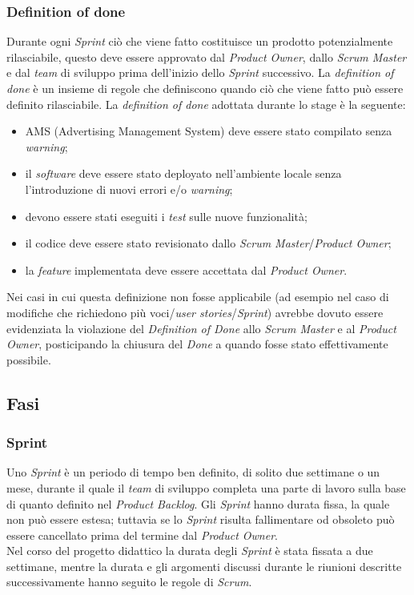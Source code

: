 \subsubsection{Definition of done}
Durante ogni \textit{Sprint} ciò che viene fatto costituisce un prodotto potenzialmente rilasciabile, questo deve essere approvato dal \textit{Product Owner}, dallo \textit{Scrum Master} e dal \textit{team} di sviluppo prima dell'inizio dello \textit{Sprint} successivo. La \textit{definition of done} è un insieme di regole che definiscono quando ciò che viene fatto può essere definito rilasciabile.
La \textit{definition of done} adottata durante lo stage è la seguente:
\begin{itemize}
    \item AMS (Advertising Management System) deve essere stato compilato senza \textit{warning};
    \item il \textit{software} deve essere stato deployato nell’ambiente locale senza l'introduzione di nuovi errori e/o \textit{warning};
    \item devono essere stati eseguiti i \textit{test} sulle nuove funzionalità;
    \item il codice deve essere stato revisionato dallo \textit{Scrum Master}/\textit{Product Owner};
    \item la \textit{feature} implementata deve essere accettata dal \textit{Product Owner}.
\end{itemize}
Nei casi in cui questa definizione non fosse applicabile (ad esempio nel caso di modifiche che richiedono più voci/\textit{user stories}/\textit{Sprint}) avrebbe dovuto essere evidenziata la violazione del \textit{Definition of Done} allo \textit{Scrum Master} e al \textit{Product Owner}, posticipando la chiusura del \textit{Done} a quando fosse stato effettivamente possibile.



\subsection{Fasi}

\subsubsection{Sprint}
Uno \textit{Sprint} è un periodo di tempo ben definito, di solito due settimane o un mese, durante il quale il \textit{team} di sviluppo completa una parte di lavoro sulla base di quanto definito nel \textit{Product Backlog}.
Gli \textit{Sprint} hanno durata fissa, la quale non può essere estesa; tuttavia se lo \textit{Sprint} risulta fallimentare od obsoleto può essere cancellato prima del termine dal \textit{Product Owner}.
\\Nel corso del progetto didattico la durata degli \textit{Sprint} è stata fissata a due settimane, mentre la durata e gli argomenti discussi durante le riunioni descritte successivamente hanno seguito le regole di \textit{Scrum}.

